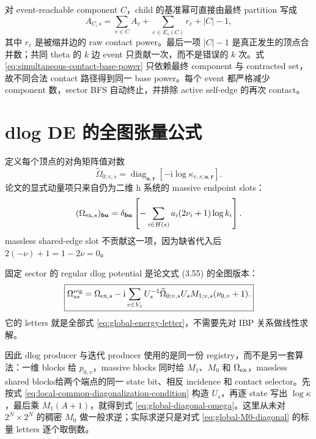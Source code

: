 \documentclass[11pt,a4paper]{ctexart}
\newcommand{\ii}{\mathrm i}
\begin{document}
对 event-reachable component $C$，child 的基准幂可直接由最终 partition 写成
\begin{equation}
 A_{C,s}=\sum_{v\in C}A_v
 +\sum_{e\in E_s(C)}r_e+|C|-1,
 \label{eq:simultaneous-contact-base-power}
\end{equation}
其中 $r_e$ 是被缩并边的 raw contact power。最后一项 $|C|-1$ 是真正发生的顶点合并数；共同 theta 的 $k$ 边 event 只贡献一次，而不是错误的 $k$ 次。式 \eqref{eq:simultaneous-contact-base-power} 只依赖最终 component 与 contracted set，故不同合法 contact 路径得到同一 base power。每个 event 都严格减少 component 数，sector BFS 自动终止，并排除 active self-edge 的再次 contact。

\section{dlog DE 的全图张量公式}

定义每个顶点的对角矩阵值对数
\begin{equation}
 \widetilde\Omega_{0;v,s}
 =\operatorname{diag}_{\bm a,\bm r}
 \left[-\ii\log\kappa_{v,s;\bm a,\bm r}\right].
 \label{eq:global-omega0}
\end{equation}
论文的显式动量项只来自仍为二维 h 系统的 massive endpoint slots：
\begin{equation}
 (\Omega_{{\rm ex},s})_{\bm b\bm a}
 =\delta_{\bm b\bm a}
 \left[-\sum_{i\in H(s)}a_i(2\nu_i+1)\log k_i\right].
 \label{eq:global-omega-ex}
\end{equation}
massless shared-edge slot 不贡献这一项，因为缺省代入后 $2(-\nu)+1=1-2\nu=0$。

固定 sector 的 regular dlog potential 是论文式 (3.55) 的全图版本：
\begin{equation}
 \boxed{
 \Omega_{ss}^{\rm reg}
 =\Omega_{{\rm ex},s}
 -\ii\sum_{v\in V_s}
 U_s^{-1}\widetilde\Omega_{0;v,s}U_s
 M_{1;v,s}(\nu_{0,v}+1).
 }
 \label{eq:global-diagonal-omega}
\end{equation}
它的 letters 就是全部式 \eqref{eq:global-energy-letter}，不需要先对 IBP 关系做线性求解。

因此 dlog producer 与迭代 producer 使用的是同一份 registry，而不是另一套算法：一维 blocks 给 $p_{0,v}$，massive blocks 同时给 $M_1$、$M_0$ 和 $\Omega_{\rm ex}$，massless shared blocks给两个端点的同一 state bit、相反 incidence 和 contact selector。先按式 \eqref{eq:local-common-diagonalization-condition} 构造 $U_s$，再逐 state 写出 $\log\kappa$，最后乘 $M_1(A+1)$，就得到式 \eqref{eq:global-diagonal-omega}。这里从未对 $2^N\times2^N$ 的稠密 $M_0$ 做一般求逆；实际求逆只是对式 \eqref{eq:global-M0-diagonal} 的标量 letters 逐个取倒数。
\end{document}
